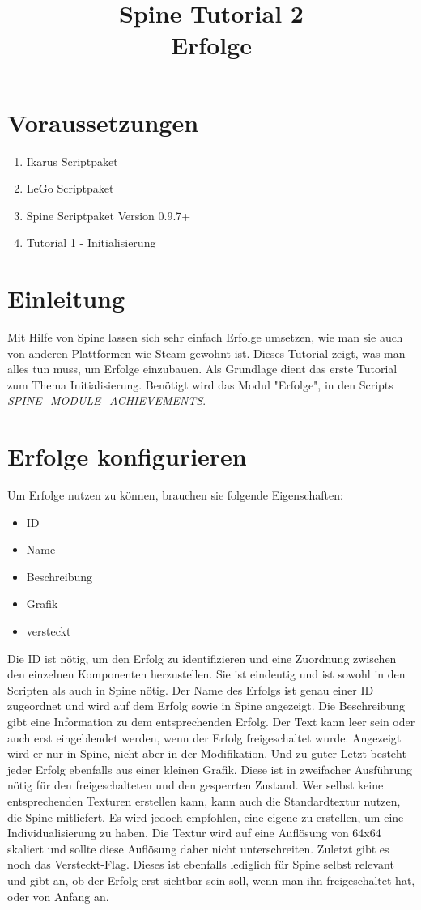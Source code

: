 \documentclass{article}
\title{Spine Tutorial 2 \\ Erfolge}
\begin{document}
\section{Voraussetzungen}

\begin{enumerate}
\item Ikarus Scriptpaket
\item LeGo Scriptpaket
\item Spine Scriptpaket Version 0.9.7+
\item Tutorial 1 - Initialisierung
\end{enumerate}

\section{Einleitung}

Mit Hilfe von Spine lassen sich sehr einfach Erfolge umsetzen, wie man sie auch von anderen Plattformen wie Steam gewohnt ist. Dieses Tutorial zeigt, was man alles tun muss, um Erfolge einzubauen. Als Grundlage dient das erste Tutorial zum Thema Initialisierung. Benötigt wird das Modul "Erfolge", in den Scripts \textit{SPINE\_MODULE\_ACHIEVEMENTS}.

\section{Erfolge konfigurieren}

Um Erfolge nutzen zu können, brauchen sie folgende Eigenschaften:

\begin{itemize}
	\item ID
	\item Name
	\item Beschreibung
	\item Grafik
	\item versteckt
\end{itemize}

Die ID ist nötig, um den Erfolg zu identifizieren und eine Zuordnung zwischen den einzelnen Komponenten herzustellen. Sie ist eindeutig und ist sowohl in den Scripten als auch in Spine nötig. Der Name des Erfolgs ist genau einer ID zugeordnet und wird auf dem Erfolg sowie in Spine angezeigt. Die Beschreibung gibt eine Information zu dem entsprechenden Erfolg. Der Text kann leer sein oder auch erst eingeblendet werden, wenn der Erfolg freigeschaltet wurde. Angezeigt wird er nur in Spine, nicht aber in der Modifikation. Und zu guter Letzt besteht jeder Erfolg ebenfalls aus einer kleinen Grafik. Diese ist in zweifacher Ausführung nötig für den freigeschalteten und den gesperrten Zustand. Wer selbst keine entsprechenden Texturen erstellen kann, kann auch die Standardtextur nutzen, die Spine mitliefert. Es wird jedoch empfohlen, eine eigene zu erstellen, um eine Individualisierung zu haben. Die Textur wird auf eine Auflösung von 64x64 skaliert und sollte diese Auflösung daher nicht unterschreiten. Zuletzt gibt es noch das Versteckt-Flag. Dieses ist ebenfalls lediglich für Spine selbst relevant und gibt an, ob der Erfolg erst sichtbar sein soll, wenn man ihn freigeschaltet hat, oder von Anfang an.\\
\end{document}

